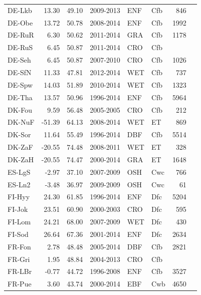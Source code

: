 \documentclass{myreport}
\begin{document}
\begin{longtable}{lrrlllrl}
 DE-Lkb & 13.30 & 49.10 & 2009-2013 & ENF & Cfb & 846 & \cite{DE-Lkb} \\ 
 DE-Obe & 13.72 & 50.78 & 2008-2014 & ENF & Cfb & 1992 & \cite{DE-Obe} \\ 
 DE-RuR & 6.30 & 50.62 & 2011-2014 & GRA & Cfb & 1178 & \cite{DE-RuR} \\ 
 DE-RuS & 6.45 & 50.87 & 2011-2014 & CRO & Cfb &  & \cite{DE-RuS} \\ 
 DE-Seh & 6.45 & 50.87 & 2007-2010 & CRO & Cfb & 1026 & \cite{DE-Seh} \\ 
 DE-SfN & 11.33 & 47.81 & 2012-2014 & WET & Cfb & 737 & \cite{DE-SfN} \\ 
 DE-Spw & 14.03 & 51.89 & 2010-2014 & WET & Cfb & 1323 & \cite{DE-Spw} \\ 
 DE-Tha & 13.57 & 50.96 & 1996-2014 & ENF & Cfb & 5964 & \cite{DE-Tha} \\ 
 DK-Fou & 9.59 & 56.48 & 2005-2005 & CRO & Cfb & 212 & \cite{DK-Fou} \\ 
 DK-NuF & -51.39 & 64.13 & 2008-2014 & WET & ET & 869 & \cite{DK-NuF} \\ 
 DK-Sor & 11.64 & 55.49 & 1996-2014 & DBF & Cfb & 5514 & \cite{DK-Sor} \\ 
 DK-ZaF & -20.55 & 74.48 & 2008-2011 & WET & ET & 328 & \cite{DK-ZaF} \\ 
 DK-ZaH & -20.55 & 74.47 & 2000-2014 & GRA & ET & 1648 & \cite{DK-ZaH} \\ 
 ES-LgS & -2.97 & 37.10 & 2007-2009 & OSH & Cwc & 766 & \cite{ES-LgS} \\ 
 ES-Ln2 & -3.48 & 36.97 & 2009-2009 & OSH & Cwc &  61 & \cite{ES-Ln2} \\ 
 FI-Hyy & 24.30 & 61.85 & 1996-2014 & ENF & Dfc & 5204 & \cite{FI-Hyy} \\ 
 FI-Jok & 23.51 & 60.90 & 2000-2003 & CRO & Dfc & 595 & \cite{FI-Jok} \\ 
 FI-Lom & 24.21 & 68.00 & 2007-2009 & WET & Dfc & 430 & \cite{FI-Lom} \\ 
 FI-Sod & 26.64 & 67.36 & 2001-2014 & ENF & Dfc & 2634 & \cite{FI-Sod} \\ 
 FR-Fon & 2.78 & 48.48 & 2005-2014 & DBF & Cfb & 2821 & \cite{FR-Fon} \\ 
 FR-Gri & 1.95 & 48.84 & 2004-2013 & CRO & Cfb &  & \cite{FR-Gri} \\ 
 FR-LBr & -0.77 & 44.72 & 1996-2008 & ENF & Cfb & 3527 & \cite{FR-LBr} \\ 
 FR-Pue & 3.60 & 43.74 & 2000-2014 & EBF & Cwb & 4650 & \cite{FR-Pue} \\ 

\end{longtable}
\end{document}
